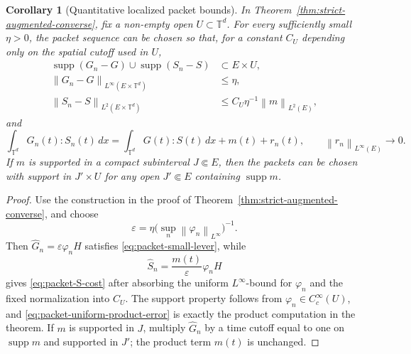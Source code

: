 \documentclass[11pt]{article}
\numberwithin{equation}{section}
\newtheorem{corollary}[theorem]{Corollary}
\newcommand{\T}{\mathbb T}
\newcommand{\norm}[1]{\left\lVert #1\right\rVert}
\begin{document}
\begin{corollary}[Quantitative localized packet bounds]
\label{cor:quantitative-localized-packets}
In Theorem~\ref{thm:strict-augmented-converse}, fix a non-empty open
\(U\subset\T^d\).  For every sufficiently small \(\eta>0\), the packet sequence
can be chosen so that, for a constant \(C_U\) depending only on the spatial
cutoff used in \(U\),
\begin{align}
  \operatorname{supp}(G_n-G)\cup\operatorname{supp}(S_n-S)
  &\subset E\times U, \label{eq:packet-support}\\
  \norm{G_n-G}_{L^\infty(E\times\T^d)}
  &\le \eta, \label{eq:packet-small-lever}\\
  \norm{S_n-S}_{L^2(E\times\T^d)}
  &\le C_U\eta^{-1}\norm{m}_{L^2(E)}, \label{eq:packet-S-cost}
\end{align}
and
\begin{equation}
  \int_{\T^d}G_n(t):S_n(t)\,dx
  =
  \int_{\T^d}G(t):S(t)\,dx+m(t)+r_n(t),
  \qquad
  \norm{r_n}_{L^\infty(E)}\to0 .
  \label{eq:packet-uniform-product-error}
\end{equation}
If \(m\) is supported in a compact subinterval \(J\Subset E\), then the packets
can be chosen with support in \(J'\times U\) for any open
\(J'\Subset E\) containing \(\operatorname{supp}m\).
\end{corollary}

\begin{proof}
Use the construction in the proof of
Theorem~\ref{thm:strict-augmented-converse}, and choose
\[
  \varepsilon=\eta\bigl(\sup_n\norm{\varphi_n}_{L^\infty}\bigr)^{-1}.
\]
Then \(\widehat G_n=\varepsilon\varphi_nH\) satisfies
\eqref{eq:packet-small-lever}, while
\[
  \widehat S_n=\frac{m(t)}{\varepsilon}\varphi_nH
\]
gives \eqref{eq:packet-S-cost} after absorbing the uniform
\(L^\infty\)-bound for \(\varphi_n\) and the fixed normalization into \(C_U\).
The support property follows from \(\varphi_n\in C_c^\infty(U)\), and
\eqref{eq:packet-uniform-product-error} is exactly the product computation in
the theorem.  If \(m\) is supported in \(J\), multiply \(\widehat G_n\) by a
time cutoff equal to one on \(\operatorname{supp}m\) and supported in \(J'\);
the product term \(m(t)\) is unchanged.
\end{proof}
\end{document}
